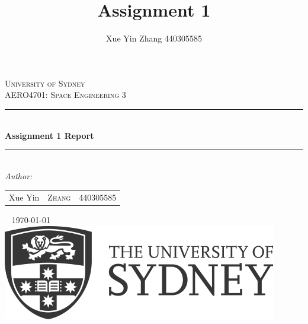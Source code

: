 \documentclass{article}
\title{Assignment 1}
\author{Xue Yin Zhang 440305585}
\numberwithin{equation}{subsection}
\numberwithin{figure}{section}
\begin{document}
	

	
\begin{titlepage}
\newcommand{\HRule}{\rule{\linewidth}{0.1mm}} 
\center
\textsc{\LARGE University of Sydney}\\[1.5cm] 
\textsc{\Large AERO4701: Space Engineering 3}\\[0.5cm] 
\HRule \\[0.4cm]
{ \huge \bfseries Assignment 1 Report}\\ 
\HRule \\[1.5cm]

\emph{Author:}\\

\begin{table}[!h]
\centering
\begin{tabular}{rlc}
Xue Yin         & \textsc{Zhang} 		& 440305585 \\
\end{tabular}
\end{table}
~
{\large \today}\\[3cm] 

\includegraphics[scale=0.3]{Logo}\\[1cm] 
\vfill 
\end{titlepage}
\tableofcontents

\newpage

\setcounter{page}{1}


\FloatBarrier
\newpage

\FloatBarrier
\newpage
 
\FloatBarrier
\newpage
\begin{appendix}
	
\end{appendix}
\FloatBarrier
\newpage




\pagebreak
\end{document}
